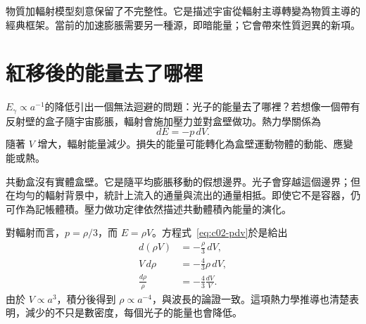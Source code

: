 \begin{classroomqa}
\end{classroomqa}

\begin{classroomqa}
\end{classroomqa}

物質加輻射模型刻意保留了不完整性。它是描述宇宙從輻射主導轉變為物質主導的經典框架。當前的加速膨脹需要另一種源，即暗能量；它會帶來性質迥異的新項。

\section{紅移後的能量去了哪裡}

\(E_\gamma\propto a^{-1}\)的降低引出一個無法迴避的問題：光子的能量去了哪裡？若想像一個帶有反射壁的盒子隨宇宙膨脹，輻射會施加壓力並對盒壁做功。熱力學關係為
\begin{equation}
dE=-p\,dV.
\label{eq:c02-pdv}
\end{equation}
隨著 \(V\) 增大，輻射能量減少。損失的能量可能轉化為盒壁運動物體的動能、應變能或熱。

共動盒沒有實體盒壁。它是隨平均膨脹移動的假想邊界。光子會穿越這個邊界；但在均勻的輻射背景中，統計上流入的通量與流出的通量相抵。即使它不是容器，仍可作為記帳體積。壓力做功定律依然描述共動體積內能量的演化。

對輻射而言，\(p=\rho/3\)，而 \(E=\rho V\)。方程式~\eqref{eq:c02-pdv}於是給出
\begin{align}
d(\rho V)&=-\frac{\rho}{3}\,dV,\\
V\,d\rho&=-\frac{4}{3}\rho\,dV,\\
\frac{d\rho}{\rho}&=-\frac{4}{3}\frac{dV}{V}.
\end{align}
由於 \(V\propto a^3\)，積分後得到 \(\rho\propto a^{-4}\)，與波長的論證一致。這項熱力學推導也清楚表明，減少的不只是數密度，每個光子的能量也會降低。

